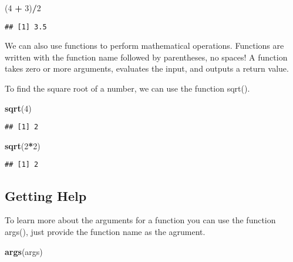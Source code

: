 \documentclass[]{article}
\newenvironment{Shaded}{\begin{snugshade}}{\end{snugshade}}
\newcommand{\KeywordTok}[1]{\textcolor[rgb]{0.13,0.29,0.53}{\textbf{#1}}}
\newcommand{\DecValTok}[1]{\textcolor[rgb]{0.00,0.00,0.81}{#1}}
\newcommand{\StringTok}[1]{\textcolor[rgb]{0.31,0.60,0.02}{#1}}
\newcommand{\OperatorTok}[1]{\textcolor[rgb]{0.81,0.36,0.00}{\textbf{#1}}}
\newcommand{\NormalTok}[1]{#1}
\begin{document}
\begin{Shaded}
\begin{Highlighting}[]
\NormalTok{(}\DecValTok{4} \OperatorTok{+}\StringTok{ }\DecValTok{3}\NormalTok{)}\OperatorTok{/}\DecValTok{2}
\end{Highlighting}
\end{Shaded}

\begin{verbatim}
## [1] 3.5
\end{verbatim}

We can also use functions to perform mathematical operations. Functions
are written with the function name followed by parentheses, no spaces! A
function takes zero or more arguments, evaluates the input, and outputs
a return value.

To find the square root of a number, we can use the function sqrt().

\begin{Shaded}
\begin{Highlighting}[]
\KeywordTok{sqrt}\NormalTok{(}\DecValTok{4}\NormalTok{)}
\end{Highlighting}
\end{Shaded}

\begin{verbatim}
## [1] 2
\end{verbatim}

\begin{Shaded}
\begin{Highlighting}[]
\KeywordTok{sqrt}\NormalTok{(}\DecValTok{2}\OperatorTok{*}\DecValTok{2}\NormalTok{)}
\end{Highlighting}
\end{Shaded}

\begin{verbatim}
## [1] 2
\end{verbatim}

\subsection{Getting Help}\label{getting-help}

To learn more about the arguments for a function you can use the
function args(), just provide the function name as the agrument.

\begin{Shaded}
\begin{Highlighting}[]
\KeywordTok{args}\NormalTok{(args)}
\end{Highlighting}
\end{Shaded}
\end{document}
